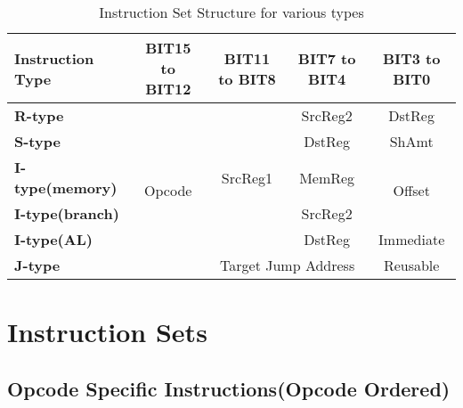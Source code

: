 \documentclass[12pt]{article}
\begin{document}
\begin{table}[H]
    \centering
    \begin{tabular}{|l|c|c|c|c|}

        \hline
        \textbf{Instruction Type} & \textbf{BIT15 to BIT12} & \textbf{BIT11 to BIT8} & \textbf{BIT7 to BIT4} & \textbf{BIT3 to BIT0} \\
        \hline
        \textbf{R-type} & \multirow{6}{*}{Opcode} & \multirow{5}{*}{SrcReg1} & SrcReg2 & DstReg\\
        \cline{1-1}
        \cline{4-5}
        \textbf{S-type} &  &  & DstReg & ShAmt\\
        \cline{1-1}
        \cline{4-5}
        \textbf{I-type(memory)} &  &  & MemReg & \multirow{2}{*}{Offset}\\
        \cline{1-1}
        \cline{4-4}
        \textbf{I-type(branch)} &  &  & SrcReg2 & \\
        \cline{1-1}
        \cline{4-5}
        \textbf{I-type(AL)} &  &  & DstReg & Immediate\\
        \cline{1-1}
        \cline{3-5}
        \textbf{J-type} &  & \multicolumn{2}{|c|}{Target Jump Address} & Reusable\\
        \hline
    \end{tabular}
    \caption{Instruction Set Structure for various types}
    \label{tab:t1}
\end{table}

\section{Instruction Sets}

\subsection{Opcode Specific Instructions(Opcode Ordered)}

\end{document}
